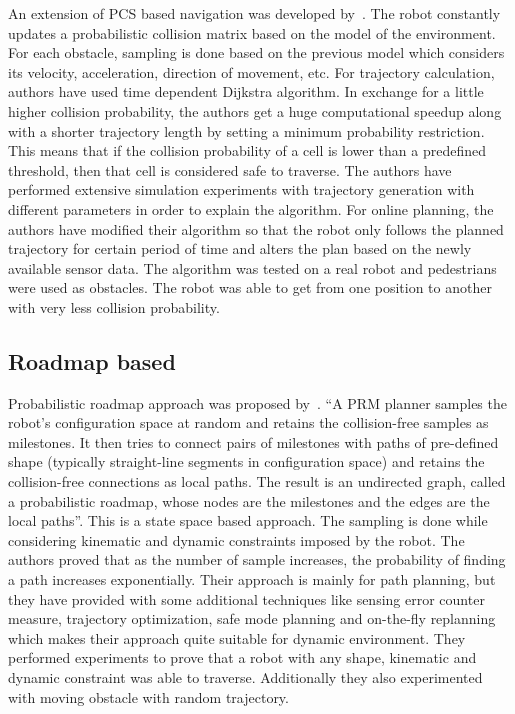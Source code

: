 An extension of PCS based navigation was developed by~\cite{hernandez2015application}. The robot constantly updates a probabilistic collision matrix based on the model of the environment. For each obstacle, sampling is done based on the previous model which considers its velocity, acceleration, direction of movement, etc. For trajectory calculation, authors have used time dependent Dijkstra algorithm. In exchange for a little higher collision probability, the authors get a huge computational speedup along with a shorter trajectory length by setting a minimum probability restriction. This means that if the collision probability of a cell is lower than a predefined threshold, then that cell is considered safe to traverse. The authors have performed extensive simulation experiments with trajectory generation with different parameters in order to explain the algorithm. For online planning, the authors have modified their algorithm so that the robot only follows the planned trajectory for certain period of time and alters the plan based on the newly available sensor data. The algorithm was tested on a real robot and pedestrians were used as obstacles. The robot was able to get from one position to another with very less collision probability.

\subsection{Roadmap based}%
\label{sub:roadmap_based}

Probabilistic roadmap approach was proposed by~\cite{hsu2002randomized}. ``A PRM planner samples the robot’s configuration space at random and retains the collision-free samples as milestones.  It then tries to connect pairs of milestones with paths of pre-defined shape (typically straight-line segments in configuration space) and retains the collision-free connections as local paths. The result is an undirected graph, called a probabilistic roadmap, whose nodes are the milestones and the edges are the local paths''\cite{hsu2002randomized}. This is a state space based approach. The sampling is done while considering kinematic and dynamic constraints imposed by the robot. The authors proved that as the number of sample increases, the probability of finding a path increases exponentially. Their approach is mainly for path planning, but they have provided with some additional techniques like sensing error counter measure, trajectory optimization, safe mode planning and on-the-fly replanning which makes their approach quite suitable for dynamic environment. They performed experiments to prove that a robot with any shape, kinematic and dynamic constraint was able to traverse. Additionally they also experimented with moving obstacle with random trajectory.

